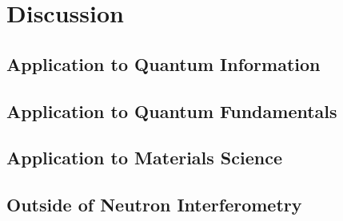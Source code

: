 
\chapter{Discussion} %
\label{Chapter5}




\section{Application to Quantum Information}
\section{Application to Quantum Fundamentals}
\section{Application to Materials Science}
\section{Outside of Neutron Interferometry}


